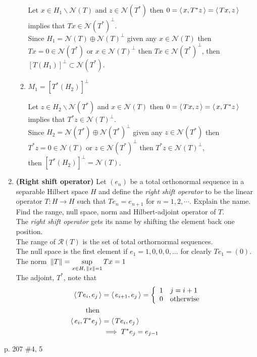 \documentclass[10pt,a4paper]{report}
\newcommand{\NLL}{\mathcal{N}}
\newcommand{\NORM}[1]{\,\left \Vert #1 \right \Vert}
\begin{document}
\begin{enumerate}
\begin{enumerate}
		Let $x \in H_1 \backslash \NLL(T)$ and $z \in \NLL(T^*)$ then $0=\left \langle\, x, T^*z \,\right \rangle=\left \langle\, Tx, z \,\right \rangle$ implies that $Tx \in \NLL(T^*)^\perp$.\\
		Since $H_1=\NLL(T)\oplus \NLL(T)^\perp$ given any $x \in \NLL(T)$ then $Tx = 0 \in \NLL(T^*)$ or $x \in \NLL(T)^\perp$ then $Tx\in \NLL(T^*)^\perp$, then $[T(H_1)]^\perp \subset \NLL(T^*)$.
		
		\item $M_1=[T^*(H_2)]^\perp$
		
		Let $z \in H_2\backslash \NLL(T^*)$ and $x \in \NLL(T)$ then $0 = \left \langle\, Tx, z \,\right \rangle= \left \langle\, x, T^*z \,\right \rangle$ implies that $T^*z \in \NLL(T)^\perp$.\\
		Since $H_2 = \NLL(T^*)\oplus \NLL(T^*)^\perp$ given any $z\in \NLL(T^*)$ then $T^*z = 0 \in \NLL(T)$ or $z \in \NLL(T^*)^\perp$ then $T^*z \in \NLL(T)^\perp$,\\
		then $[T^*(H_2)]^\perp = \NLL(T)$.
	\end{enumerate}
	\setcounter{enumi}{9}
	\item \textbf{(Right shift operator)} Let $(e_n)$ be a total orthonormal sequence in a separable Hilbert space $H$ and define the \textit{right shift operator} to be the linear operator $T: H \to H$ such that $Te_n=e_{n+1}$ for $n=1,2,\cdots$.  Explain the name.  Find the range, null space, norm and Hilbert-adjoint operator of $T$.\\
	
	The \textit{right shift operator} gets its name by shifting the element back one position.\\
	The range of $\mathcal{R}(T)$ is the set of total orthornormal sequences.\\
	The null space is the first element if $e_1 = 1, 0, 0, 0, \dots $ for clearly $Te_1 = (0)$.  \\
	The norm $\NORM{T} = \SUP{x \in H, \NORM{x}=1} Tx = 1$\\
	The adjoint, $T^*$, note that 
	\begin{align*}
		\left \langle\, Te_i, e_j \,\right \rangle &= \left \langle\, e_{i+1}, e_j \,\right \rangle = \left \{ \begin{array}{ll}  1 & j = i+1 \\ 0 & \text{otherwise} \end{array} \right . \\
		\text{ then }&\\
		\left \langle\, e_i, T^*e_j \,\right \rangle &= \left \langle\, Te_i, e_j \,\right \rangle \\
		& \implies T^*e_j = e_{j-1}
	\end{align*}

\end{enumerate}

\newpage
p. 207 \#4, 5
\end{document}
